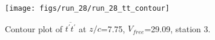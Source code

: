 \begin{figure}[H]
\centering
\texttt{[image: figs/run\_28/run\_28\_tt\_contour]}
\caption{Contour plot of $\overline{t^\prime t^\prime}$ at $z/c$=7.75, $V_{free}$=29.09, station 3.}
\label{fig:run_28_tt_contour}
\end{figure}



